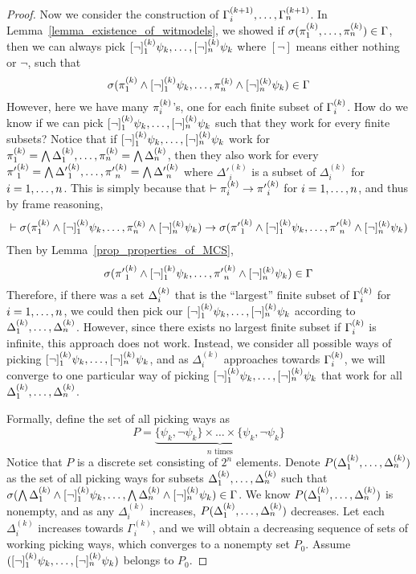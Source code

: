 \documentclass{amsart}
\begin{document}
\begin{proof}
Now we consider the construction of
$\Gamma_i^{(k+1)} ,\dots, \Gamma_n^{(k+1)}$.
In Lemma~\ref{lemma_existence_of_witmodels}, we showed 
if $\sigma(\pi_1^{(k)} ,\dots, \pi_n^{(k)}) \in \Gamma$,
then we can always pick
$[\neg]_1^{(k)} \psi_k ,\dots, [\neg]_n^{(k)} \psi_k$
where $[\neg]$ means either nothing or $\neg$,
such that
$$
\sigma(
  \pi_1^{(k)} \wedge [\neg]_1^{(k)} \psi_k ,\dots,
  \pi_n^{(k)} \wedge [\neg]_n^{(k)} \psi_k
)
\in \Gamma
$$
However, here we have many $\pi_i^{(k)}$'s, one for each finite subset of 
$\Gamma_i^{(k)}$.
How do we know if we can pick 
$[\neg]_1^{(k)} \psi_k ,\dots, [\neg]_n^{(k)} \psi_k$
such that they work for every finite subsets?
Notice that if $[\neg]_1^{(k)} \psi_k ,\dots, [\neg]_n^{(k)} \psi_k$
work for 
$
\pi_1^{(k)} = \bigwedge \Delta_1^{(k)} 
,\dots, 
\pi_n^{(k)} = \bigwedge \Delta_n^{(k)} 
$,
then they also work for
every
$
{\pi'}_1^{(k)} = \bigwedge {\Delta'}_1^{(k)} 
,\dots, 
{\pi'}_n^{(k)} = \bigwedge {\Delta'}_n^{(k)} 
$
where 
${\Delta'}_i^{(k)}$ is a subset of $\Delta_i^{(k)}$ for $i = 1 ,\dots, n$.
This is simply because that
$\vdash \pi_i^{(k)} \to {\pi'}_i^{(k)}$ for $i = 1 ,\dots, n$,
and thus by frame reasoning,
\begin{align*}
\vdash
\sigma(
  \pi_1^{(k)} \wedge [\neg]_1^{(k)} \psi_k ,\dots,
  \pi_n^{(k)} \wedge [\neg]_n^{(k)} \psi_k
)
\to
\sigma(
  {\pi'}_1^{(k)} \wedge [\neg]_1^{(k)} \psi_k ,\dots,
  {\pi'}_n^{(k)} \wedge [\neg]_n^{(k)} \psi_k
)
\end{align*}
Then by Lemma~\ref{prop_properties_of_MCS},
$$
\sigma(
  {\pi'}_1^{(k)} \wedge [\neg]_1^{(k)} \psi_k ,\dots,
  {\pi'}_n^{(k)} \wedge [\neg]_n^{(k)} \psi_k
)
\in \Gamma
$$
Therefore, if there was a set $\Delta_i^{(k)}$
that is the ``largest'' finite subset of $\Gamma_i^{(k)}$
for $i = 1 ,\dots, n$,
we could then pick our
$[\neg]_1^{(k)} \psi_k ,\dots, [\neg]_n^{(k)} \psi_k$
according to
$\Delta_1^{(k)} ,\dots, \Delta_n^{(k)}$.
However, since there exists no largest finite subset
if $\Gamma_i^{(k)}$ is infinite,
this approach does not work.
Instead, we consider all possible ways of picking
$[\neg]_1^{(k)} \psi_k ,\dots, [\neg]_n^{(k)} \psi_k$,
and as $\Delta_i^{(k)}$ approaches towards $\Gamma_i^{(k)}$,
we will converge to one particular way of picking
$[\neg]_1^{(k)} \psi_k ,\dots, [\neg]_n^{(k)} \psi_k$
that work for all
$\Delta_1^{(k)} ,\dots, \Delta_n^{(k)}$.

Formally, define the set of all picking ways as
$$
P = \underbrace{
	\{ \psi_k , \neg \psi_k \} \times \dots \times
    \{ \psi_k , \neg \psi_k \}
    }_\text{
    $n$ times
    }
$$
Notice that $P$ is a discrete set consisting of $2^n$ elements.
Denote $P(\Delta_1^{(k)} ,\dots, \Delta_n^{(k)})$
as the set of all picking ways
for subsets $\Delta_1^{(k)} ,\dots, \Delta_n^{(k)}$
such that
$
\sigma(\bigwedge \Delta_1^{(k)} \wedge [\neg]_1^{(k)} \psi_k
  ,\dots, \bigwedge \Delta_n^{(k)} \wedge [\neg]_n^{(k)} \psi_k) \in \Gamma
$.
We know $P(\Delta_1^{(k)} ,\dots, \Delta_n^{(k)})$ is nonempty,
and as any $\Delta_i^{(k)}$ increases,
$P(\Delta_1^{(k)} ,\dots, \Delta_n^{(k)})$ decreases.
Let each $\Delta_i^{(k)}$ increases towards $\Gamma_i^{(k)}$,
and we will obtain a decreasing sequence of
sets of working picking ways,
which converges to a nonempty set $P_0$.
Assume 
$([\neg]_1^{(k)} \psi_k ,\dots, [\neg]_n^{(k)} \psi_k)$ belongs to $P_0$.


\end{proof}
\end{document}
